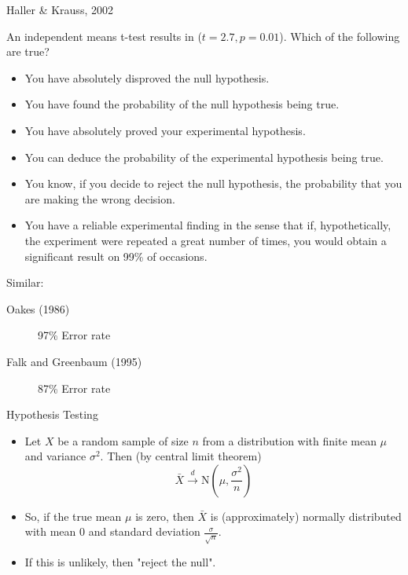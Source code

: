 
\begin{frame}{Haller \& Krauss, 2002}

 An independent means t-test results in ($t = 2.7, p = 0.01$). Which of the following are true?
	\begin{itemize}
		\item You have absolutely disproved the null hypothesis.
		\item You have found the probability of the null hypothesis being true.
		\item You have absolutely proved your experimental hypothesis.
		\item You can deduce the probability of the experimental hypothesis being true.
		\item You know, if you decide to reject the null hypothesis, the probability that 	
			  you are making the wrong decision.
		\item You have a reliable experimental finding in the sense that if, 
			  hypothetically, the experiment were repeated a great number of times, you 
			  would obtain a significant result on 99\% of occasions.
	\end{itemize}
\end{frame}
\begin{frame}

\begin{center}
\end{center}
\end{frame}
\begin{frame}
Similar:
	\begin{description}
		\item[Oakes (1986)] 97\% Error rate
		\item[Falk and Greenbaum (1995)] 87\% Error rate
	\end{description}
\end{frame}

\begin{frame}{Hypothesis Testing}
	\begin{itemize}
		\pause
		\item Let $X$ be a random sample of size $n$ from a distribution with 
			  finite mean $\mu$ and variance $\sigma^2$. Then (by central limit theorem)
			 \[\bar{X} \xrightarrow{d} \mathrm{N}\left (\mu, \frac{\sigma^2}{n}\right )\]
		\pause
		\item So, if the true mean $\mu$ is zero, then $\bar{X}$ is (approximately) 
			  normally distributed with mean $0$ and standard deviation 
			  $\frac{\sigma}{\sqrt{n}}$.
		\pause
		\item If this is unlikely, then "reject the null".
	\end{itemize}
\end{frame}

